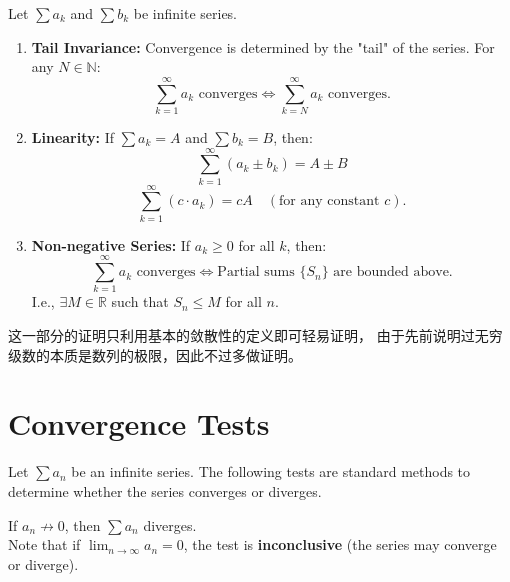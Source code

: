 \documentclass[
	UTF-8,
	11pt, %
	a4paper, %
]{LegrandOrangeBook}
\begin{document}
    \begin{theorem}
    Let $\sum a_k$ and $\sum b_k$ be infinite series.

    \begin{enumerate}
        \item \textbf{Tail Invariance:} Convergence is determined by the "tail" of the series. For any $N \in \mathbb{N}$:
        \[ \sum_{k=1}^{\infty} a_k \text{ converges} \iff \sum_{k=N}^{\infty} a_k \text{ converges}. \]
        
        \item \textbf{Linearity:} If $\sum a_k = A$ and $\sum b_k = B$, then:
        \[ \sum_{k=1}^{\infty} (a_k \pm b_k) = A \pm B \]
        \[ \sum_{k=1}^{\infty} (c \cdot a_k) = c A \quad (\text{for any constant } c). \]
        
        \item \textbf{Non-negative Series:} If $a_k \ge 0$ for all $k$, then:
        \[ \sum_{k=1}^{\infty} a_k \text{ converges} \iff \text{Partial sums } \{S_n\} \text{ are bounded above}. \]
        I.e., $\exists M \in \mathbb{R}$ such that $S_n \le M$ for all $n$.
    \end{enumerate}
    \end{theorem}

    \begin{remark}
        这一部分的证明只利用基本的敛散性的定义即可轻易证明，
        由于先前说明过无穷级数的本质是数列的极限，因此不过多做证明。
    \end{remark}

    \newpage

    \section{Convergence Tests} 

    Let $\sum a_n$ be an infinite series. 
    The following tests are standard methods to determine whether the series converges or diverges.

    \begin{theorem}
        If $a_n \nrightarrow  0$, then 
        $
        \sum a_n
        $
        diverges. \\
        
        Note that if $\lim_{n \to \infty} a_n = 0$, 
        the test is \textbf{inconclusive} (the series may converge or diverge).
    \end{theorem}
\end{document}
